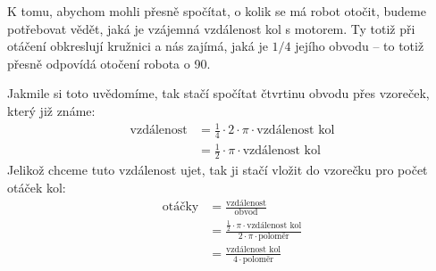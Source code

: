 \documentclass[../main.tex]{subfiles}
\begin{document}
	\begin{solution*}
		K tomu, abychom mohli přesně spočítat, o kolik se má robot otočit, budeme potřebovat vědět, jaká je vzájemná vzdálenost kol s motorem. Ty totiž při otáčení obkreslují kružnici a nás zajímá, jaká je $1/4$ jejího obvodu -- to totiž přesně odpovídá otočení robota o 90\degree.

		Jakmile si toto uvědomíme, tak stačí spočítat čtvrtinu obvodu přes vzoreček, který již známe:
		$$
		\begin{aligned}
			\text{vzdálenost} &= \frac{1}{4} \cdot 2 \cdot \pi \cdot \text{vzdálenost kol} \\
			&= \frac{1}{2} \cdot \pi \cdot \text{vzdálenost kol}
		\end{aligned}
		$$
		Jelikož chceme tuto vzdálenost ujet, tak ji stačí vložit do vzorečku pro počet otáček kol:
		$$
		\begin{aligned}
			\text{otáčky} &= \frac{\text{vzdálenost}}{\text{obvod}} \\
			&=  \frac{\frac{1}{2} \cdot \pi \cdot \text{vzdálenost kol}}{2 \cdot \pi \cdot \text{poloměr}}  \\
			&= \frac{\text{vzdálenost kol}}{4 \cdot \text{poloměr}}
		\end{aligned}
		$$
	\end{solution*}
\end{document}
